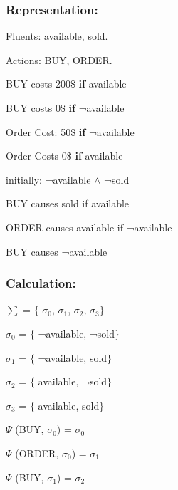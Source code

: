 \documentclass[11pt]{article}
\begin{document}
	\subsubsection{Representation:}\label{par:p202}
	\indent 
	\par Fluents: available, sold.\par
	Actions: BUY, ORDER.\par
	BUY costs 200$\$$  \textbf{if} available\par
	
	BUY costs 0$\$$  \textbf{if} ¬available\par
	
	
	Order Cost: 50$\$$ \textbf{if} ¬available\par
	Order Costs 0$\$$ \textbf{if} available\par
	initially: ¬available $\wedge$  ¬sold\par
	
	BUY causes sold if available\par
	
	ORDER causes available if ¬available\par
	
	BUY causes ¬available\\
	
	\subsubsection{Calculation:}\label{par:p302}
	\indent \par
	$ \sum $ = $ \{ $ $ \sigma _{0}$, $ \sigma _{1}$, $ \sigma _{2}$, $ \sigma _{3}$$ \} $ \par
	
	$ \sigma _{0}$ = $ \{ $ ¬available, ¬sold$ \} $ \par
	
	$ \sigma _{1}$ = $ \{ $ ¬available, sold$ \} $ \par
	
	$ \sigma _{2}$ = $ \{ $ available, ¬sold$ \} $ \par

	$ \sigma _{3}$ = $ \{ $ available, sold$ \} $ \par
	\(  \Psi  \)  (BUY, $ \sigma _{0}$) = $ \sigma _{0}$\par
	
	\(  \Psi  \)  (ORDER, $ \sigma _{0}$) = $ \sigma _{1}$\par
	
	\(  \Psi  \)  (BUY, $ \sigma _{1}$) = $ \sigma _{2}$\par
	
\end{document}
